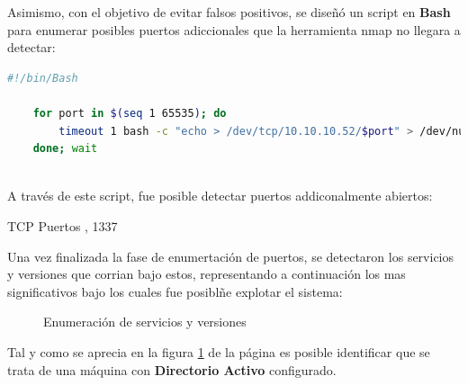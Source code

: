 \documentclass[a4paper]{article} %
\begin{document}
    \clearpage
    Asimismo, con el objetivo de evitar falsos positivos, se diseñó 
    un script en \textbf{Bash} para enumerar  posibles puertos 
    adiccionales que la herramienta nmap no llegara a detectar:

    \vspace{0.2cm}

    \begin{lstlisting}[language=Bash, caption=Script personalizado para la enumeración de puertos]
    #!/bin/Bash

    for port in $(seq 1 65535); do
        timeout 1 bash -c "echo > /dev/tcp/10.10.10.52/$port" > /dev/null && echo "$port/tcp" &
    done; wait
        
    \end{lstlisting}
    
    \vspace{0.3cm}

    A través de este script, fue posible detectar puertos addiconalmente 
    abiertos:

    \begin{schema}{TCP}
    Puertos
    , 1337
    \end{schema}

    Una vez finalizada la fase de enumertación de puertos, se 
    detectaron los servicios y versiones que corrian bajo estos, 
    representando a continuación los mas significativos bajo los 
    cuales fue posiblñe explotar el sistema:

    \begin{figure}[h]
    \centering
    \caption{Enumeración de servicios y versiones}    
    \label{fig:servicesResults}
    \end{figure}

    \vspace{0.2cm}

    Tal y como se aprecia en la figura \ref{fig:servicesResults} de la 
    página \pageref{fig:servicesResults} es posible identificar  que se 
    trata de una máquina con \textbf{Directorio Activo} configurado.
\end{document}
